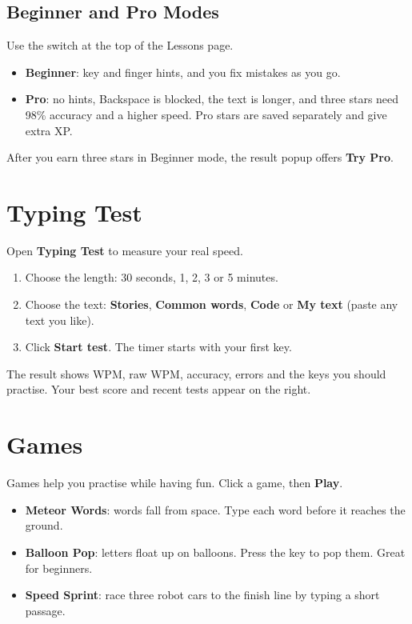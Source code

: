 \section{Beginner and Pro Modes}
Use the switch at the top of the Lessons page.
\begin{itemize}
\item \textbf{Beginner}: key and finger hints, and you fix mistakes as you go.
\item \textbf{Pro}: no hints, Backspace is blocked, the text is longer, and three stars need 98\% accuracy and a higher speed. Pro stars are saved separately and give extra XP.
\end{itemize}
After you earn three stars in Beginner mode, the result popup offers \textbf{Try Pro}.

\chapter{Typing Test}
Open \textbf{Typing Test} to measure your real speed.
\begin{enumerate}
\item Choose the length: 30 seconds, 1, 2, 3 or 5 minutes.
\item Choose the text: \textbf{Stories}, \textbf{Common words}, \textbf{Code} or \textbf{My text} (paste any text you like).
\item Click \textbf{Start test}. The timer starts with your first key.
\end{enumerate}
The result shows WPM, raw WPM, accuracy, errors and the keys you should practise. Your best score and recent tests appear on the right.

\chapter{Games}
Games help you practise while having fun. Click a game, then \textbf{Play}.
\begin{itemize}
\item \textbf{Meteor Words}: words fall from space. Type each word before it reaches the ground.
\item \textbf{Balloon Pop}: letters float up on balloons. Press the key to pop them. Great for beginners.
\item \textbf{Speed Sprint}: race three robot cars to the finish line by typing a short passage.
\end{itemize}

